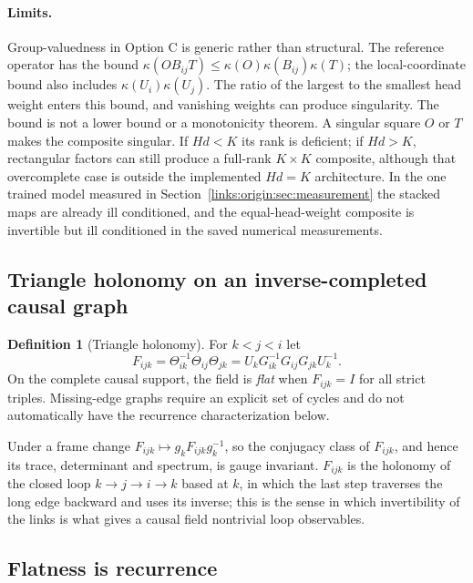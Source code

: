 \documentclass[11pt]{article}
\theoremstyle{definition}
\newtheorem{definition}[theorem]{Definition}
\theoremstyle{remark}
\begin{document}
\paragraph{Limits.}
Group-valuedness in Option C is generic rather than structural. The reference operator has the bound $\kappa(OB_{ij}T)\le\kappa(O)\kappa(B_{ij})\kappa(T)$; the local-coordinate bound also includes $\kappa(U_i)\kappa(U_j)$. The ratio of the largest to the smallest head weight enters this bound, and vanishing weights can produce singularity. The bound is not a lower bound or a monotonicity theorem. A singular square $O$ or $T$ makes the composite singular. If $Hd<K$ its rank is deficient; if $Hd>K$, rectangular factors can still produce a full-rank $K\times K$ composite, although that overcomplete case is outside the implemented $Hd=K$ architecture. In the one trained model measured in Section~\ref{links:origin:sec:measurement} the stacked maps are already ill conditioned, and the equal-head-weight composite is invertible but ill conditioned in the saved numerical measurements.

\subsection{Triangle holonomy on an inverse-completed causal graph}
\label{links:curve:sec:setting}

\begin{definition}[Triangle holonomy]
For $k<j<i$ let
\begin{equation}
F_{ijk}=\Theta_{ik}^{-1}\Theta_{ij}\Theta_{jk}=U_kG_{ik}^{-1}G_{ij}G_{jk}U_k^{-1}.
\label{links:curve:eq:holonomy}
\end{equation}
On the complete causal support, the field is \emph{flat} when $F_{ijk}=I$ for all strict triples. Missing-edge graphs require an explicit set of cycles and do not automatically have the recurrence characterization below.
\end{definition}

Under a frame change $F_{ijk}\mapsto g_kF_{ijk}g_k^{-1}$, so the conjugacy class of $F_{ijk}$, and hence its trace, determinant and spectrum, is gauge invariant. $F_{ijk}$ is the holonomy of the closed loop $k\to j\to i\to k$ based at $k$, in which the last step traverses the long edge backward and uses its inverse; this is the sense in which invertibility of the links is what gives a causal field nontrivial loop observables.

\subsection{Flatness is recurrence}
\label{links:curve:sec:flat}
\end{document}
